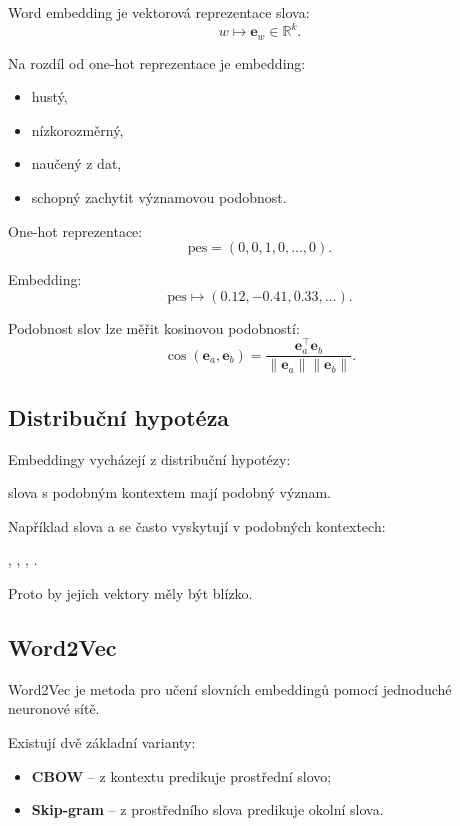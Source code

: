 Word embedding je vektorová reprezentace slova:
\[
w
\mapsto
\mathbf{e}_w\in\mathbb{R}^k.
\]

Na rozdíl od one-hot reprezentace je embedding:
\begin{itemize}
    \item hustý,
    \item nízkorozměrný,
    \item naučený z dat,
    \item schopný zachytit významovou podobnost.
\end{itemize}

One-hot reprezentace:
\[
\text{pes}=(0,0,1,0,\ldots,0).
\]

Embedding:
\[
\text{pes}\mapsto (0.12,-0.41,0.33,\ldots).
\]

Podobnost slov lze měřit kosinovou podobností:
\[
\cos(\mathbf{e}_a,\mathbf{e}_b)
=
\frac{\mathbf{e}_a^\top\mathbf{e}_b}
{\|\mathbf{e}_a\|\|\mathbf{e}_b\|}.
\]

\subsection{Distribuční hypotéza}

Embeddingy vycházejí z distribuční hypotézy:
\begin{center}
slova s podobným kontextem mají podobný význam.
\end{center}

Například slova  a  se často vyskytují v podobných kontextech:
\begin{center}
, , , .
\end{center}

Proto by jejich vektory měly být blízko.

\subsection{Word2Vec}

Word2Vec je metoda pro učení slovních embeddingů pomocí jednoduché neuronové sítě.

Existují dvě základní varianty:
\begin{itemize}
    \item \textbf{CBOW} -- z kontextu predikuje prostřední slovo;
    \item \textbf{Skip-gram} -- z prostředního slova predikuje okolní slova.
\end{itemize}

